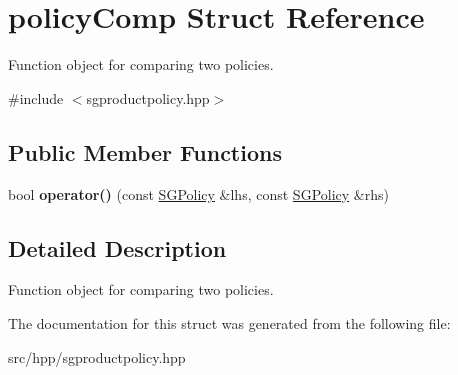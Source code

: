 \hypertarget{structpolicyComp}{}\section{policy\+Comp Struct Reference}
\label{structpolicyComp}


Function object for comparing two policies.  




{\ttfamily \#include $<$sgproductpolicy.\+hpp$>$}

\subsection*{Public Member Functions}
\begin{DoxyCompactItemize}
\item 
\mbox{\label{structpolicyComp_ab3833f236dea57a4ee36cce768d6869e}} 
bool {\bfseries operator()} (const \hyperlink{classSGPolicy}{S\+G\+Policy} \&lhs, const \hyperlink{classSGPolicy}{S\+G\+Policy} \&rhs)
\end{DoxyCompactItemize}


\subsection{Detailed Description}
Function object for comparing two policies. 

The documentation for this struct was generated from the following file\+:\begin{DoxyCompactItemize}
\item 
src/hpp/sgproductpolicy.\+hpp\end{DoxyCompactItemize}
